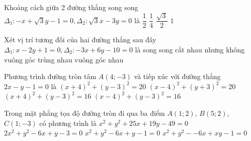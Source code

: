 \begin{ex}%
	Khoảng cách giữa 2 đường thẳng song song $\Delta_1\colon -x+\sqrt{3}y-1=0, \Delta_2\colon \sqrt{3}x-3y=0$ là
	\choice
	{\True $\dfrac{1}{2}$}
	{$\dfrac{1}{4}$}
	{$\dfrac{\sqrt{3}}{2}$}
	{$1$}
\end{ex}
\begin{ex}%
	Xét vị trí tương đối của hai đường thẳng sau đây $\Delta_1\colon x-2y+1=0, \Delta_2\colon -3x+6y-10=0$ là
	\choice
	{\True song song}
	{cắt nhau nhưng không vuông góc}
	{trùng nhau}
	{vuông góc nhau}
\end{ex}
\begin{ex}%
	Phương trình đường tròn tâm $ A(4;-3) $ và tiếp xúc với đường thẳng $ 2x-y-1=0 $ là
	\choice
	{$ (x+4)^2+(y-3)^2=20 $}
	{$ (x-4)^2+(y+3)^2=20 $}
	{\True $ (x+4)^2+(y-3)^2=16 $}
	{$ (x-4)^2+(y-3)^2=16 $}
\end{ex}
\begin{ex}%
	Trong mặt phẳng tọa độ đường tròn đi qua ba điểm $A(1 ; 2)$, $B(5 ; 2)$, $C(1 ; -3)$ có phương trình là
	\choice
	{$x^2+y^2+25x+19y-49=0$}
	{$2x^2+y^2-6x+y-3=0$}
	{\True $x^2+y^2-6x+y-1=0$}
	{$x^2+y^2--6x+xy-1=0$}
\end{ex}

